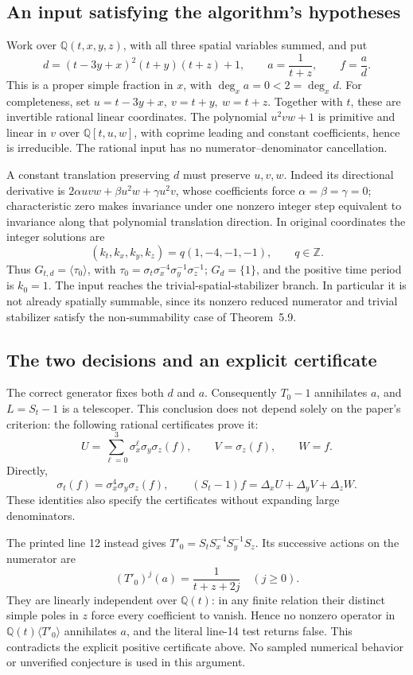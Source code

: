 \documentclass[10pt]{article}
\begin{document}
\subsection*{An input satisfying the algorithm’s hypotheses}
Work over \(\mathbb Q(t,x,y,z)\), with all three spatial variables summed, and put \[d=(t-3y+x)^2(t+y)(t+z)+1,\qquad
 a=\frac1{t+z},\qquad f=\frac{a}{d}.\] This is a proper simple fraction in \(x\), with \(\deg_x a=0<2=\deg_x d\). For completeness, set \(u=t-3y+x,\ v=t+y,\ w=t+z\). Together with \(t\), these are invertible rational linear coordinates. The polynomial \(u^2vw+1\) is primitive and linear in \(v\) over \(\mathbb Q[t,u,w]\), with coprime leading and constant coefficients, hence is irreducible. The rational input has no numerator–denominator cancellation.\par
A constant translation preserving \(d\) must preserve \(u,v,w\). Indeed its directional derivative is \(2\alpha uvw+\beta u^2w+\gamma u^2v\), whose coefficients force \(\alpha=\beta=\gamma=0\); characteristic zero makes invariance under one nonzero integer step equivalent to invariance along that polynomial translation direction. In original coordinates the integer solutions are \[(k_t,k_x,k_y,k_z)=q(1,-4,-1,-1),\qquad q\in\mathbb Z.\] Thus \(G_{t,d}=\langle\tau_0\rangle\), with \(\tau_0=\sigma_t\sigma_x^{-4}\sigma_y^{-1}\sigma_z^{-1}\); \(G_d=\{1\}\), and the positive time period is \(k_0=1\). The input reaches the trivial-spatial-stabilizer branch. In particular it is not already spatially summable, since its nonzero reduced numerator and trivial stabilizer satisfy the non-summability case of Theorem 5.9.\par
\subsection*{The two decisions and an explicit certificate}
The correct generator fixes both \(d\) and \(a\). Consequently \(T_0-1\) annihilates \(a\), and \(L=S_t-1\) is a telescoper. This conclusion does not depend solely on the paper’s criterion: the following rational certificates prove it: \[U=\sum_{\ell=0}^{3}\sigma_x^\ell\sigma_y\sigma_z(f),
 \qquad V=\sigma_z(f),\qquad W=f.\] Directly, \[\sigma_t(f)=\sigma_x^4\sigma_y\sigma_z(f),\qquad
 (S_t-1)f=\Delta_xU+\Delta_yV+\Delta_zW.\] These identities also specify the certificates without expanding large denominators.\par
The printed line 12 instead gives \(T'_0=S_tS_x^{-4}S_y^{-1}S_z\). Its successive actions on the numerator are \[(T'_0)^j(a)=\frac1{t+z+2j}\quad(j\ge0).\] They are linearly independent over \(\mathbb Q(t)\): in any finite relation their distinct simple poles in \(z\) force every coefficient to vanish. Hence no nonzero operator in \(\mathbb Q(t)\langle T'_0\rangle\) annihilates \(a\), and the literal line-14 test returns false. This contradicts the explicit positive certificate above. No sampled numerical behavior or unverified conjecture is used in this argument.\par
\end{document}
